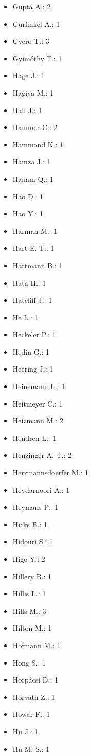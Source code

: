 \begin{itemize}
\item Gupta A.: 2
\item Gurfinkel A.: 1
\item Gvero T.: 3
\item Gyimóthy T.: 1
\item Hage J.: 1
\item Hagiya M.: 1
\item Hall J.: 1
\item Hammer C.: 2
\item Hammond K.: 1
\item Hamza J.: 1
\item Hanam Q.: 1
\item Hao D.: 1
\item Hao Y.: 1
\item Harman M.: 1
\item Hart E. T.: 1
\item Hartmann B.: 1
\item Hata H.: 1
\item Hatcliff J.: 1
\item He L.: 1
\item Heckeler P.: 1
\item Hedin G.: 1
\item Heering J.: 1
\item Heinemann L.: 1
\item Heitmeyer C.: 1
\item Heizmann M.: 2
\item Hendren L.: 1
\item Henzinger A. T.: 2
\item Herrmannsdoerfer M.: 1
\item Heydarnoori A.: 1
\item Heymans P.: 1
\item Hicks B.: 1
\item Hidouri S.: 1
\item Higo Y.: 2
\item Hillery B.: 1
\item Hillis L.: 1
\item Hills M.: 3
\item Hilton M.: 1
\item Hofmann M.: 1
\item Hong S.: 1
\item Horp\'{a}csi D.: 1
\item Horvath Z.: 1
\item Howar F.: 1
\item Hu J.: 1
\item Hu M. S.: 1

\end{itemize}
